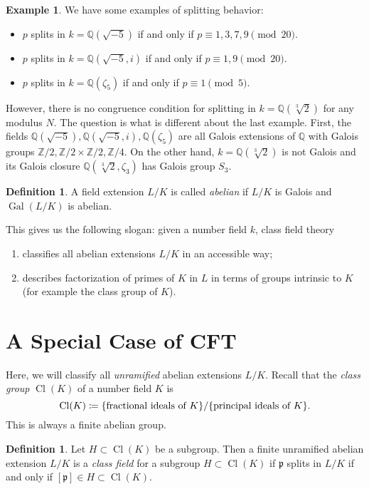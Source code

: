 \documentclass[leqno, openany]{memoir}
\theoremstyle{definition}
\newtheorem{defn}[thm]{Definition}
\newtheorem{exm}[thm]{Example}
\theoremstyle{remark}
\theoremstyle{plain}
\theoremstyle{definition}
\theoremstyle{remark}
\newcommand{\Z}{\mathbb{Z}}
\newcommand{\Q}{\mathbb{Q}}
\newcommand{\mf}[1]{\mathfrak{#1}}
\DeclareMathOperator{\Gal}{Gal}
\DeclareMathOperator{\Cl}{Cl}
\begin{document}
\begin{exm} We have some examples of splitting behavior: \begin{itemize} \item
    $p$ splits in $k = \Q(\sqrt{-5})$ if and only if $p \equiv 1,3,7,9 \pmod
    20$.  \item $p$ splits in $k = \Q(\sqrt{-5}, i)$ if and only if $p \equiv
    1,9 \pmod 20$.  \item $p$ splits in $k = \Q(\zeta_5)$ if and only if $p
    \equiv 1 \pmod 5$.  \end{itemize} However, there is no congruence condition
    for splitting in $k = \Q(\sqrt[3]{2})$ for any modulus $N$. The question is
    what is different about the last example. First, the fields $\Q(\sqrt{-5}),
    \Q(\sqrt{-5}, i), \Q(\zeta_5)$ are all Galois extensions of $\Q$ with
    Galois groups $\Z/2, \Z/2 \times \Z/2, \Z/4$. On the other hand, $k =
    \Q(\sqrt[3]{2})$ is not Galois and its Galois closure $\Q(\sqrt[3]{2},
    \zeta_3)$ has Galois group $S_3$.  \end{exm}

\begin{defn} A field extension $L/K$ is called \textit{abelian} if $L/K$ is
Galois and $\Gal(L/K)$ is abelian.  \end{defn}

This gives us the following slogan: given a number field $k$, class field
theory \begin{enumerate} \item classifies all abelian extensions $L/K$ in an
    accessible way; \item describes factorization of primes of $K$ in $L$ in
    terms of groups intrinsic to $K$ (for example the class group of $K$).
    \end{enumerate}

\section{A Special Case of CFT}%

Here, we will classify all \textit{unramified} abelian extensions $L/K$. Recall
that the \textit{class group} $\Cl(K)$ of a number field $K$ is \[ \Cl(K)
\coloneqq \qty{\text{fractional ideals of $K$}} / \qty{\text{principal ideals
of $K$}}. \] This is always a finite abelian group.

\begin{defn} Let $H \subset \Cl(K)$ be a subgroup. Then a finite unramified
abelian extension $L/K$ is a \textit{class field} for a subgroup $H \subset
\Cl(K)$ if $\mf{p}$ splits in $L/K$ if and only if $[\mf{p}] \in H \subset
\Cl(K)$.  \end{defn}
\end{document}
